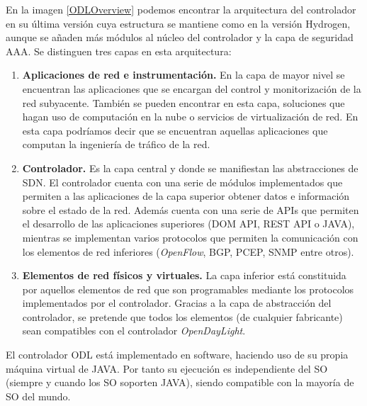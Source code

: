 \documentclass[a4paper,11pt]{book}
\begin{document}
En la imagen \ref{ODLOverview} podemos encontrar la arquitectura del controlador en su última versión cuya estructura se mantiene como en la versión Hydrogen, aunque se añaden más módulos al núcleo del controlador y la capa de seguridad \ac{AAA}. Se distinguen tres capas en esta arquitectura:

\begin{enumerate}

\item \textbf{Aplicaciones de red e instrumentación.} En la capa de mayor nivel se encuentran las aplicaciones que se encargan del control y monitorización de la red subyacente. También se pueden encontrar en esta capa, soluciones que hagan uso de computación en la nube o servicios de virtualización de red. En esta capa podríamos decir que se encuentran aquellas aplicaciones que computan la ingeniería de tráfico de la red.

\item \textbf{Controlador.} Es la capa central y donde se manifiestan las abstracciones de \ac{SDN}. El controlador cuenta con una serie de módulos implementados que permiten a las aplicaciones de la capa superior obtener datos e información sobre el estado de la red. Además cuenta con una serie de \ac{API}s que permiten el desarrollo de las aplicaciones superiores (\ac{DOM} \ac{API}, \ac{REST} \ac{API} o JAVA), mientras se implementan varios protocolos que permiten la comunicación con los elementos de red inferiores (\emph{OpenFlow}, \ac{BGP}, \ac{PCEP}, \ac{SNMP} entre otros).
 
\item \textbf{Elementos de red físicos y virtuales.} La capa inferior está constituida por aquellos elementos de red que son programables mediante los protocolos implementados por el controlador. Gracias a la capa de abstracción del controlador, se pretende que todos los elementos (de cualquier fabricante) sean compatibles con el controlador \emph{OpenDayLight}.

\end{enumerate}

El controlador \ac{ODL} está implementado en software, haciendo uso de su propia máquina virtual de JAVA. Por tanto su ejecución es independiente del \ac{SO} (siempre y cuando los \ac{SO} soporten JAVA), siendo compatible con la mayoría de \ac{SO} del mundo.
\end{document}
